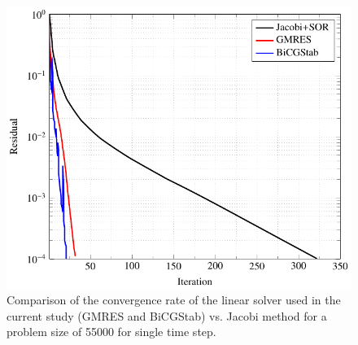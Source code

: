 %
\begin{figure}[H]
	\centering
	\includegraphics[width=.6\textwidth]{images/IISPH/tikz/Solvers.png}
	\caption{Comparison of the convergence rate of the linear solver used in the current study (GMRES and BiCGStab) vs. Jacobi method for a problem size of \num{55000} for single time step.}
	\label{fig:Solvers}
\end{figure}

